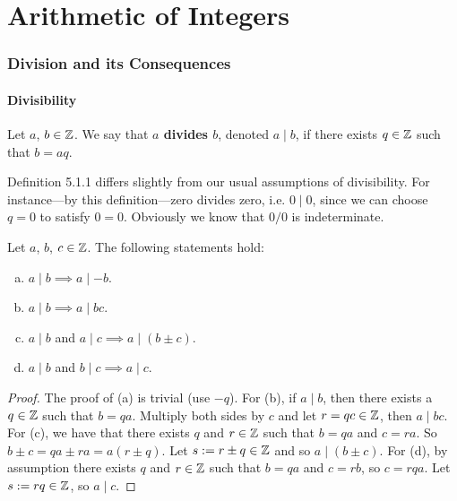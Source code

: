 \part{Arithmetic of Integers}

\section{Division and its Consequences}

\subsection{Divisibility}

\begin{defbox}
   Let $a$, $b \in \mathbb{Z}$. We say that \textbf{$a$ divides $b$}, denoted $a \mid b$, if there exists $q \in \mathbb{Z}$ such that $b = aq$.
\end{defbox}

\begin{remark}
   Definition 5.1.1 differs slightly from our usual assumptions of divisibility. For instance---by this definition---zero divides zero, i.e. $0 \mid 0$, since we can choose $q = 0$ to satisfy $0 = 0$. Obviously we know that $0/0$ is indeterminate.  
\end{remark}

\begin{propbox}
   Let $a$, $b$, $c \in \mathbb{Z}$. The following statements hold:
   \begin{enumerate}[(a)]
      \item $a \mid b \implies a \mid -b$.
      \item $a \mid b \implies a \mid bc$.
      \item $a \mid b$ and $a \mid c \implies a \mid (b \pm c)$.
      \item $a \mid b$ and $b \mid c \implies a \mid c$.
   \end{enumerate}
\end{propbox}
\begin{proof}
   The proof of (a) is trivial (use $-q$). For (b), if $a \mid b$, then there exists a $q \in \mathbb{Z}$ such that $b = qa$. Multiply both sides by $c$ and let $r = qc \in \mathbb{Z}$, then $a \mid bc$. For (c), we have that there exists $q$ and $r \in \mathbb{Z}$ such that $b = qa$ and $c = ra$. So $b \pm c = qa \pm ra = a(r \pm q)$. Let $s := r \pm q \in \mathbb{Z}$ and so $a \mid (b \pm c)$. For (d), by assumption there exists $q$ and $r \in \mathbb{Z}$ such that $b = qa$ and $c = rb$, so $c = rqa$. Let $s := rq \in \mathbb{Z}$, so $a \mid c$.
\end{proof}

